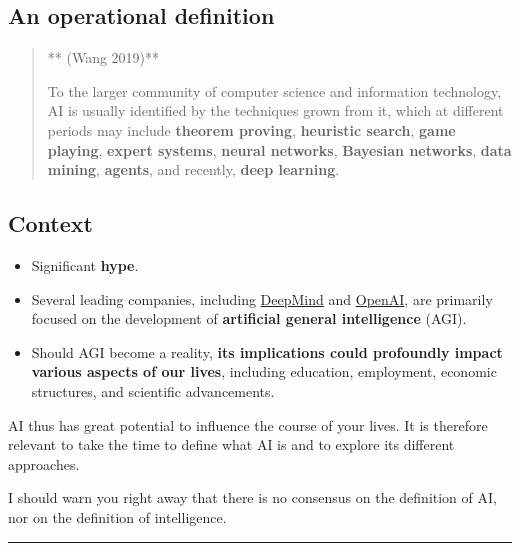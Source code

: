 \documentclass[
  letterpaper,
  DIV=11,
  numbers=noendperiod]{scrartcl}
\providecommand{\tightlist}{%
  \setlength{\itemsep}{0pt}\setlength{\parskip}{0pt}}
\begin{document}
\subsection{An operational definition}\label{an-operational-definition}

\begin{quote}
** (Wang 2019)**

To the larger community of computer science and information technology,
AI is usually identified by the techniques grown from it, which at
different periods may include \textbf{theorem proving},
\textbf{heuristic search}, \textbf{game playing}, \textbf{expert
systems}, \textbf{neural networks}, \textbf{Bayesian networks},
\textbf{data mining}, \textbf{agents}, and recently, \textbf{deep
learning}.
\end{quote}

\subsection{Context}\label{context}

\begin{itemize}
\tightlist
\item
  Significant \textbf{hype}.
\item
  Several leading companies, including
  \href{https://deepmind.google}{DeepMind} and
  \href{https://openai.com}{OpenAI}, are primarily focused on the
  development of \textbf{artificial general intelligence} (AGI).
\item
  Should AGI become a reality, \textbf{its implications could profoundly
  impact various aspects of our lives}, including education, employment,
  economic structures, and scientific advancements.
\end{itemize}

AI thus has great potential to influence the course of your lives. It is
therefore relevant to take the time to define what AI is and to explore
its different approaches.

I should warn you right away that there is no consensus on the
definition of AI, nor on the definition of intelligence.

\begin{center}\rule{0.5\linewidth}{0.5pt}\end{center}
\end{document}
